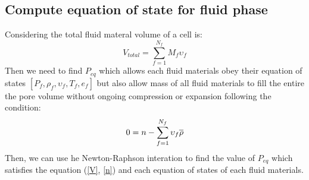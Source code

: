 \documentclass[preprint,12pt]{elsarticle}
\begin{document}
\subsection{\textsf{Compute equation of state for fluid phase}}
Considering the total fluid materal volume of a cell is:
%
%
\begin{equation}
\label{V}
    V_{total} = \sum_{f=1}^{N_f} M_f \upsilon_f 
\end {equation}
%
%
Then we need to find $P_{eq}$ which allows each fluid materials obey their equation of states $[P_f, \rho_f, \upsilon_f, T_f, e_f]$ but also allow mass of all fluid materials to fill the entire the pore volume without ongoing compression or expansion following the condition:
%
%
\begin{equation}
    0 = n - \sum_{f=1}^{N_f} \upsilon_f \overline{\rho}\\
\label{n}
\end {equation}
%
%
Then, we can use he Newton-Raphson interation to find the value of $P_{eq}$ which satisfies the equation (\ref{V}, \ref{n}) and each equation of states of each fluid materials.
\end{document}
